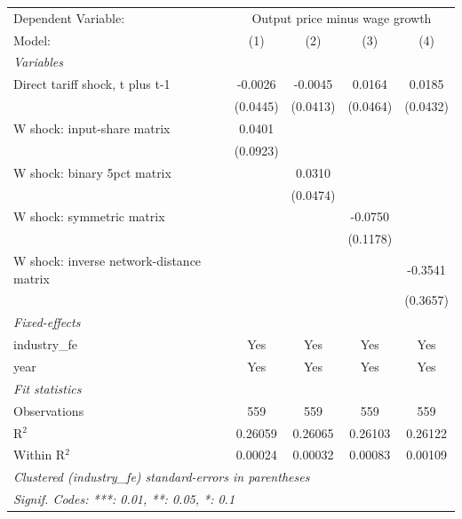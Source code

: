 \begingroup
\centering
\begin{tabular}{lcccc}
   \tabularnewline \midrule \midrule
   Dependent Variable: & \multicolumn{4}{c}{Output price minus wage growth}\\
   Model:                                   & (1)      & (2)      & (3)      & (4)\\  
   \midrule
   \emph{Variables}\\
   Direct tariff shock, t plus t-1          & -0.0026  & -0.0045  & 0.0164   & 0.0185\\   
                                            & (0.0445) & (0.0413) & (0.0464) & (0.0432)\\   
   W shock: input-share matrix              & 0.0401   &          &          &   \\   
                                            & (0.0923) &          &          &   \\   
   W shock: binary 5pct matrix              &          & 0.0310   &          &   \\   
                                            &          & (0.0474) &          &   \\   
   W shock: symmetric matrix                &          &          & -0.0750  &   \\   
                                            &          &          & (0.1178) &   \\   
   W shock: inverse network-distance matrix &          &          &          & -0.3541\\   
                                            &          &          &          & (0.3657)\\   
   \midrule
   \emph{Fixed-effects}\\
   industry\_fe                             & Yes      & Yes      & Yes      & Yes\\  
   year                                     & Yes      & Yes      & Yes      & Yes\\  
   \midrule
   \emph{Fit statistics}\\
   Observations                             & 559      & 559      & 559      & 559\\  
   R$^2$                                    & 0.26059  & 0.26065  & 0.26103  & 0.26122\\  
   Within R$^2$                             & 0.00024  & 0.00032  & 0.00083  & 0.00109\\  
   \midrule \midrule
   \multicolumn{5}{l}{\emph{Clustered (industry\_fe) standard-errors in parentheses}}\\
   \multicolumn{5}{l}{\emph{Signif. Codes: ***: 0.01, **: 0.05, *: 0.1}}\\
\end{tabular}
\par\endgroup
